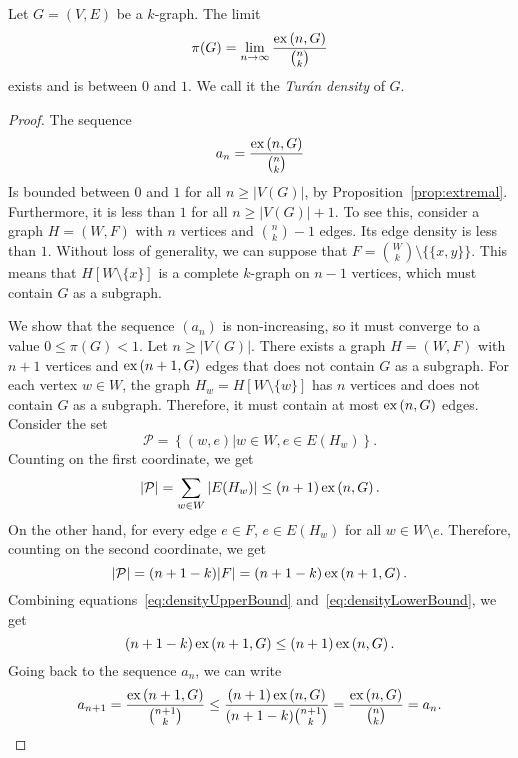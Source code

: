 \begin{theorem}
    Let $G = (V, E)$ be a $k$-graph.
    The limit
    \begin{equation} \label{eq:turan_density}
        \pi(G) = \lim_{n \to \infty} \frac{\text{ex} \left( n, G \right)}{\binom{n}{k}}
    \end{equation}
    exists and is between $0$ and $1$.
    We call it the \emph{Turán density} of $G$.
    \begin{proof}
        The sequence
        \[
            a_n = \frac{\text{ex} \left( n, G \right)}{\binom{n}{k}}
        \]
        Is bounded between $0$ and $1$ for all $n \geq |V(G)|$, by Proposition~\ref{prop:extremal}.
        Furthermore, it is less than $1$ for all $n \geq |V(G)| + 1$.
        To see this, consider a graph $H = (W, F)$ with $n$ vertices and $\binom{n}{k} - 1$ edges.
        Its edge density is less than $1$.
        Without loss of generality, we can suppose that $F = \binom{W}{k} \setminus \{\{x, y\}\}$.
        This means that $H[W \setminus \{x\}]$ is a complete $k$-graph on $n - 1$ vertices,
        which must contain $G$ as a subgraph.

        We show that the sequence $(a_n)$ is non-increasing, so it must converge to a value $0 \leq \pi(G) < 1$.
        Let $n \geq |V(G)|$.
        There exists a graph $H = (W, F)$ with $n+1$ vertices and $\text{ex} \left( n+1, G \right)$ edges that does not contain
        $G$ as a subgraph.
        For each vertex $w \in W$, the graph $H_w = H[W \setminus \{w\}]$ has $n$ vertices
        and does not contain $G$ as a subgraph.
        Therefore, it must contain at most $\text{ex} \left( n, G \right)$ edges.
        Consider the set
        \[
            \mathcal{P} = \left\{ (w, e) | w \in W, e \in E(H_w) \right\}.
        \]
        Counting on the first coordinate, we get
        \begin{equation} \label{eq:densityUpperBound}
            |\mathcal{P}| = \sum_{w \in W} |E(H_w)| \leq (n+1)\, \text{ex} \left( n, G \right).
        \end{equation}
        On the other hand, for every edge $e \in F$, $e \in E(H_w)$
        for all $w \in W \setminus e$.
        Therefore, counting on the second coordinate, we get
        \begin{equation} \label{eq:densityLowerBound}
            |\mathcal{P}| = (n + 1 - k) |F| = (n + 1 - k)\, \text{ex} \left( n+1, G \right).
        \end{equation}
        Combining equations~\eqref{eq:densityUpperBound} and~\eqref{eq:densityLowerBound},
        we get
        \[
            (n + 1 - k)\, \text{ex} \left( n+1, G \right) \leq (n + 1)\, \text{ex} \left( n, G \right).
        \]
        Going back to the sequence $a_n$, we can write
        \[
            a_{n+1} = \frac{\text{ex} \left( n+1, G \right)}{\binom{n+1}{k}} \leq
            \frac{(n + 1)\, \text{ex} \left( n, G \right)}{(n + 1 - k) \binom{n+1}{k}} =
            \frac{\text{ex} \left( n, G \right)}{\binom{n}{k}} = a_n. \qedhere
        \]
    \end{proof}
\end{theorem}

